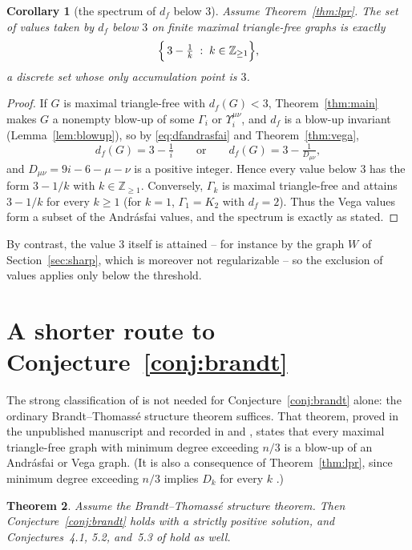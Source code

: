 \documentclass[11pt]{article}
\newtheorem{theorem}{Theorem}[section]
\newtheorem{corollary}[theorem]{Corollary}
\theoremstyle{definition}
\theoremstyle{remark}
\newcommand{\df}{d_f}
\begin{document}
\begin{corollary}[the spectrum of $\df$ below $3$]\label{cor:spectrum}
Assume Theorem~\ref{thm:lpr}. The set of values taken by $\df$ below $3$ on finite maximal
triangle-free graphs is exactly
\[
\Bigl\{\,3-\tfrac1k \;:\; k\in\mathbb Z_{\ge1}\Bigr\},
\]
a discrete set whose only accumulation point is $3$.
\end{corollary}

\begin{proof}
If $G$ is maximal triangle-free with $\df(G)<3$, Theorem~\ref{thm:main} makes $G$ a
nonempty blow-up of some $\Gamma_i$ or $\Upsilon_i^{\mu\nu}$, and $\df$ is a blow-up
invariant (Lemma~\ref{lem:blowup}), so by \eqref{eq:dfandrasfai} and
Theorem~\ref{thm:vega},
\[
\df(G)=3-\tfrac1i
\qquad\text{or}\qquad
\df(G)=3-\tfrac1{D_{\mu\nu}},
\]
and $D_{\mu\nu}=9i-6-\mu-\nu$ is a positive integer. Hence every value below $3$ has the
form $3-1/k$ with $k\in\mathbb Z_{\ge1}$. Conversely, $\Gamma_k$ is maximal triangle-free
and attains $3-1/k$ for every $k\ge1$ (for $k=1$, $\Gamma_1=K_2$ with $\df=2$). Thus the
Vega values form a subset of the Andr\'asfai values, and the spectrum is exactly as
stated.
\end{proof}

By contrast, the value $3$ itself is attained -- for instance by the graph $W$ of
Section~\ref{sec:sharp}, which is moreover not regularizable -- so the exclusion of
values applies only below the threshold.

\section{A shorter route to Conjecture~\ref{conj:brandt}}\label{sec:short}

The strong classification of \cite{LPR} is not needed for Conjecture~\ref{conj:brandt}
alone: the ordinary Brandt--Thomass\'e structure theorem suffices. That theorem, proved in
the unpublished manuscript \cite{BT} and recorded in \cite{LPR2021} and
\cite[Section~1]{LPR}, states that every maximal triangle-free graph with minimum degree
exceeding $n/3$ is a blow-up of an Andr\'asfai or Vega graph. (It is also a consequence of
Theorem~\ref{thm:lpr}, since minimum degree exceeding $n/3$ implies $D_k$ for every $k$
\cite{LPR}.)

\begin{theorem}\label{thm:short}
Assume the Brandt--Thomass\'e structure theorem. Then Conjecture~\ref{conj:brandt} holds
with a strictly positive solution, and Conjectures~4.1, 5.2, and~5.3 of \cite{Brandt2002}
hold as well.
\end{theorem}
\end{document}
